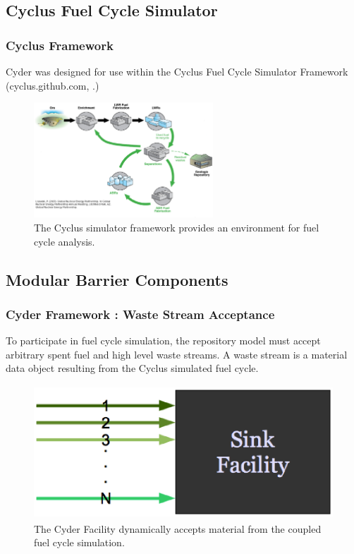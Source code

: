 
\subsection{Cyclus Fuel Cycle Simulator}

\begin{frame}[ctb!]
  \frametitle{Cyclus Framework}
  \footnotesize{
  Cyder was designed for use within the Cyclus Fuel Cycle Simulator Framework 
  (cyclus.github.com, \cite{huff_cyclus:_2010}.)
  \begin{figure}[htb!]
    \begin{center}
      \includegraphics[width=0.6\textwidth]{./cyder/images/simulations.eps}
    \end{center}
    \caption{The Cyclus simulator framework provides an environment for fuel 
    cycle analysis.}
    \label{fig:simulations}
  \end{figure}
}
\end{frame}

\subsection{Modular Barrier Components}



\begin{frame}[ctb!]
  \frametitle{Cyder Framework : Waste Stream Acceptance}
  \footnotesize{
  
To participate in fuel cycle simulation, the repository model must accept arbitrary 
spent fuel and high level waste streams. A waste stream is a material data 
object resulting from the Cyclus simulated fuel cycle.  
  \begin{figure}[htbp!]
    \begin{center}
      \includegraphics[height=5cm]{./cyder/images/sinkfacility.eps}
    \end{center}
    \caption{ The Cyder Facility dynamically accepts material from the 
    coupled fuel cycle simulation.} 
    \label{fig:sinkfacility}
  \end{figure}
}
\end{frame}

